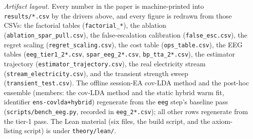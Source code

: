 \documentclass[11pt]{article}
\begin{document}
\emph{Artifact layout.}
Every number in the paper is machine-printed into \texttt{results/*.csv} by the drivers above, and every figure is redrawn from those CSVs: the factorial tables (\texttt{factorial\_*}), the ablation (\texttt{ablation\_spar\_pull.csv}), the false-escalation calibration (\texttt{false\_esc.csv}), the regret scaling (\texttt{regret\_scaling.csv}), the cost table (\texttt{ops\_table.csv}), the EEG tables (\texttt{eeg\_tier1\_2*.csv}, \texttt{spar\_eeg\_2*.csv}, \texttt{bp\_tta\_2*.csv}), the estimator trajectory (\texttt{estimator\_trajectory.csv}), the real electricity stream (\texttt{stream\_electricity.csv}), and the transient strength sweep (\texttt{transient\_test.csv}).
The offline session-EA cov-LDA method and the post-hoc ensemble (members: the cov-LDA method and the static hybrid warm fit, identifier \texttt{ens-covlda+hybrid}) regenerate from the \texttt{eeg} step's baseline pass (\texttt{scripts/bench\_eeg.py}, recorded in \texttt{eeg\_2*.csv}); all other rows regenerate from the tier-1 pass.
The Lean material (six files, the build script, and the axiom-listing script) is under \texttt{theory/lean/}.


\end{document}
